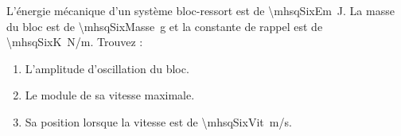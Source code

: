 L’énergie mécanique d’un système bloc-ressort est de \qty{\mhsqSixEm}{J}. La masse du bloc est de \qty{\mhsqSixMasse}{g} et la constante de rappel est de \qty{\mhsqSixK}{N/m}. Trouvez :

\begin{enumerate}[label=\alph*)]
    \item L’amplitude d’oscillation du bloc.
    \item Le module de sa vitesse maximale.
    \item Sa position lorsque la vitesse est de \qty{\mhsqSixVit}{m/s}.
\end{enumerate}